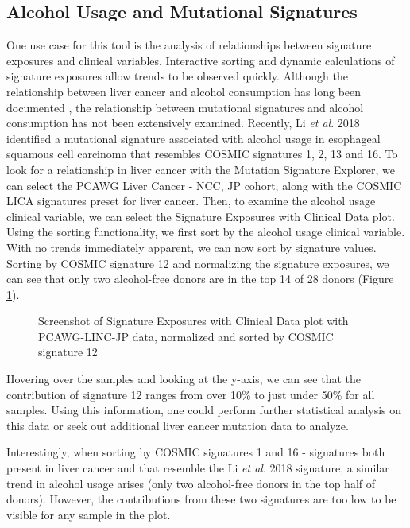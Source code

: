 \documentclass[12pt, letterpaper]{article}
\begin{document}
\subsection{Alcohol Usage and Mutational Signatures}
One use case for this tool is the analysis of relationships between signature exposures and clinical variables.
Interactive sorting and dynamic calculations of signature exposures allow trends to be observed quickly.
Although the relationship between liver cancer and alcohol consumption has long been documented \cite{bosch2004primary}, the relationship between mutational signatures and alcohol consumption has not been extensively examined.
Recently, Li \textit{et al}. 2018 identified a mutational signature associated with alcohol usage in esophageal squamous cell carcinoma that resembles COSMIC signatures 1, 2, 13 and 16\cite{li2018mutational}.
To look for a relationship in liver cancer with the Mutation Signature Explorer, we can select the PCAWG Liver Cancer - NCC, JP cohort, along with the COSMIC LICA signatures preset for liver cancer. 
Then, to examine the alcohol usage clinical variable, we can select the Signature Exposures with Clinical Data plot.
Using the sorting functionality, we first sort by the alcohol usage clinical variable.
With no trends immediately apparent, we can now sort by signature values.
Sorting by COSMIC signature 12 and normalizing the signature exposures, we can see that only two alcohol-free donors are in the top 14 of 28 donors (Figure \ref{fig:caseStudy1_sig12}).
\begin{figure}[h]
    \centering
    \caption{Screenshot of Signature Exposures with Clinical Data plot with PCAWG-LINC-JP data, normalized and sorted by COSMIC signature 12}
    \label{fig:caseStudy1_sig12}
\end{figure}
Hovering over the samples and looking at the y-axis, we can see that the contribution of signature 12 ranges from over 10\% to just under 50\% for all samples.
Using this information, one could perform further statistical analysis on this data or seek out additional liver cancer mutation data to analyze.

Interestingly, when sorting by COSMIC signatures 1 and 16 - signatures both present in liver cancer and that resemble the Li \textit{et al}. 2018 signature, a similar trend in alcohol usage arises (only two alcohol-free donors in the top half of donors).
However, the contributions from these two signatures are too low to be visible for any sample in the plot.
\end{document}

